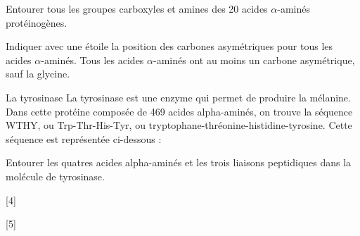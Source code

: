\schematisation
Entourer tous les groupes carboxyles et amines des 20 acides $\alpha$-aminés protéinogènes.
    
\schematisation
Indiquer avec une étoile la position des carbones asymétriques pour tous les acides $\alpha$-aminés. Tous les acides $\alpha$-aminés ont au moins un carbone asymétrique, sauf la glycine.

\begin{doc}{La tyrosinase}
  La tyrosinase est une enzyme qui permet de produire la mélanine.
  Dans cette protéine composée de 469 acides alpha-aminés, on trouve la séquence WTHY, ou Trp-Thr-His-Tyr, ou tryptophane-thréonine-histidine-tyrosine.
  Cette séquence est représentée ci-dessous :
  \medskip
  \begin{center}
  \end{center}
\end{doc}

\schematisation
Entourer les quatres acides alpha-aminés et les trois liaisons peptidiques dans la molécule de tyrosinase.


[4]

[5]